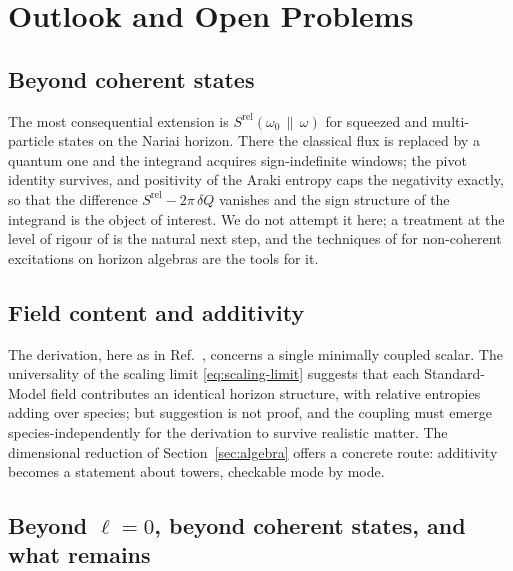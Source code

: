 \documentclass[11pt]{article}
\newcommand{\Srel}{S^{\mathrm{rel}}}
\newcommand{\Nariai}{Nariai}
\begin{document}
\section{Outlook and Open Problems}
\label{sec:outlook}

\subsection{Beyond coherent states}

The most consequential extension is $\Srel(\omega_0\,\|\,\omega)$ for squeezed and multi-particle states on the \Nariai{} horizon. There the classical flux is replaced by a quantum one and the integrand acquires sign-indefinite windows; the pivot identity survives, and positivity of the Araki entropy caps the negativity exactly, so that the difference $\Srel - 2\pi\,\delta Q$ vanishes and the sign structure of the integrand is the object of interest. We do not attempt it here; a treatment at the level of rigour of \cite{KPV} is the natural next step, and the techniques of \cite{Cadamuro} for non-coherent excitations on horizon algebras are the tools for it.

\subsection{Field content and additivity}

The derivation, here as in Ref.~\cite{DorauMuch}, concerns a single minimally coupled scalar. The universality of the scaling limit \eqref{eq:scaling-limit} suggests that each Standard-Model field contributes an identical horizon structure, with relative entropies adding over species; but suggestion is not proof, and the coupling must emerge species-independently for the derivation to survive realistic matter. The dimensional reduction of Section~\ref{sec:algebra} offers a concrete route: additivity becomes a statement about towers, checkable mode by mode.

\subsection{Beyond $\ell=0$, beyond coherent states, and what remains}
\end{document}
